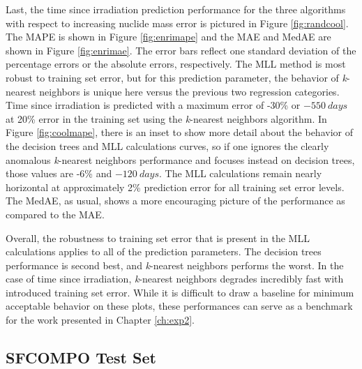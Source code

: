 Last, the time since irradiation prediction performance for the three
algorithms with respect to increasing nuclide mass error is pictured in Figure
\ref{fig:randcool}.  The \gls{MAPE} is shown in Figure \ref{fig:enrimape} and
the \gls{MAE} and \gls{MedAE} are shown in Figure \ref{fig:enrimae}.  The error
bars reflect one standard deviation of the percentage errors or the absolute
errors, respectively.  The \gls{MLL} method is most robust to training set
error, but for this prediction parameter, the behavior of \textit{k}-nearest
neighbors is unique here versus the previous two regression categories.  Time
since irradiation is predicted with a maximum error of -30\% or $-550\:days$ at
20\% error in the training set using the \textit{k}-nearest neighbors
algorithm.  In Figure \ref{fig:coolmape}, there is an inset to show more detail
about the behavior of the decision trees and \gls{MLL} calculations curves, so
if one ignores the clearly anomalous \textit{k}-nearest neighbors performance
and focuses instead on decision trees, those values are -6\% and $-120\:days$.
The \gls{MLL} calculations remain nearly horizontal at approximately 2\%
prediction error for all training set error levels.  The \gls{MedAE}, as usual,
shows a more encouraging picture of the performance as compared to the
\gls{MAE}.

Overall, the robustness to training set error that is present in the \gls{MLL}
calculations applies to all of the prediction parameters. The decision trees
performance is second best, and \textit{k}-nearest neighbors performs the
worst.  In the case of time since irradiation, \textit{k}-nearest neighbors
degrades incredibly fast with introduced training set error.  While it is
difficult to draw a baseline for minimum acceptable behavior on these plots,
these performances can serve as a benchmark for the work presented in Chapter
\ref{ch:exp2}. 



\subsection{SFCOMPO Test Set}
\label{sec:sfcompo}


